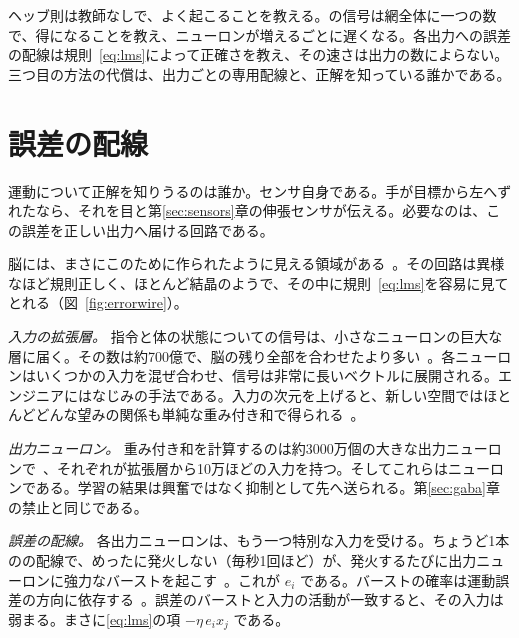\begin{keyblock}
\begin{proposition}[三人の教師]
\label{prop:teachers}
ヘッブ則は教師なしで、よく起こることを教える。の信号は網全体に一つの数で、得になることを教え、ニューロンが増えるごとに遅くなる。各出力への誤差の配線は規則~\eqref{eq:lms}によって正確さを教え、その速さは出力の数によらない。三つ目の方法の代償は、出力ごとの専用配線と、正解を知っている誰かである。
\end{proposition}
\end{keyblock}

\section{誤差の配線}

運動について正解を知りうるのは誰か。センサ自身である。手が目標から左へずれたなら、それを目と第\ref{sec:sensors}章の伸張センサが伝える。必要なのは、この誤差を正しい出力へ届ける回路である。

脳には、まさにこのために作られたように見える領域がある~\cite{Marr1969,Albus1971}。その回路は異様なほど規則正しく、ほとんど結晶のようで、その中に規則~\eqref{eq:lms}を容易に見てとれる（図~\ref{fig:errorwire}）。

\emph{入力の拡張層。} 指令と体の状態についての信号は、小さなニューロンの巨大な層に届く。その数は約700億で、脳の残り全部を合わせたより多い~\cite{Azevedo2009}。各ニューロンはいくつかの入力を混ぜ合わせ、信号は非常に長いベクトルに展開される。エンジニアにはなじみの手法である。入力の次元を上げると、新しい空間ではほとんどどんな望みの関係も単純な重み付き和で得られる~\cite{Cover1965}。

\emph{出力ニューロン。} 重み付き和を計算するのは約3000万個の大きな出力ニューロンで~\cite{Andersen1992cereb}、それぞれが拡張層から10万ほどの入力を持つ。そしてこれらはニューロンである。学習の結果は興奮ではなく抑制として先へ送られる。第\ref{sec:gaba}章の禁止と同じである。

\emph{誤差の配線。} 各出力ニューロンは、もう一つ特別な入力を受ける。ちょうど1本のの配線で、めったに発火しない（毎秒1回ほど）が、発火するたびに出力ニューロンに強力なバーストを起こす~\cite{Ito2001}。これが $e_i$ である。バーストの確率は運動誤差の方向に依存する~\cite{Herzfeld2018}。誤差のバーストと入力の活動が一致すると、その入力は弱まる。まさに\eqref{eq:lms}の項 $-\eta\,e_i x_j$ である。


